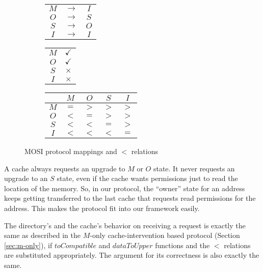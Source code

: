 \begin{figure}
\begin{subfigure}{.25\linewidth}
\centering
\begin{tabular}{|ccc|}
\hline
$M$ & $\rightarrow$ & $I$\\
$O$ & $\rightarrow$ & $S$\\
$S$ & $\rightarrow$ & $O$\\
$I$ & $\rightarrow$ & $I$\\
\hline
\end{tabular}
\end{subfigure}
\begin{subfigure}{.25\linewidth}
\centering
\begin{tabular}{|c|c|}
\hline
$M$ & $\checkmark$\\
$O$ & $\checkmark$\\
$S$ & $\times$\\
$I$ & $\times$\\
\hline
\end{tabular}
\end{subfigure}
\begin{subfigure}{.48\linewidth}
\centering
\begin{tabular}{|c|cccc|}
\hline
& $M$ & $O$ & $S$ & $I$\\
\hline
$M$ & $=$ & $>$ & $>$ & $>$\\
$O$ & $<$ & $=$ & $>$ & $>$\\
$S$ & $<$ & $<$ & $=$ & $>$\\
$I$ & $<$ & $<$ & $<$ & $=$\\
\hline
\end{tabular}
\end{subfigure}
\caption{MOSI protocol mappings and $<$ relations}
\label{fig:o-extend}
\end{figure}

A cache always requests an upgrade to $M$ or $O$ state. It never requests an
upgrade to an $S$ state, even if the cache wants permissions just to read the
location of the memory. So, in our protocol, the ``owner'' state for an address
keeps getting transferred to the last cache that requests read permissions for
the address. This makes the protocol fit into our framework easily.

The directory's and the cache's behavior on receiving a request is exactly the
same as described in the $M$-only cache-intervention based protocol (Section
\ref{sec:m-only}), if $toCompatible$ and $dataToUpper$ functions and the $<$
relations are substituted appropriately. The argument for its correctness is
also exactly the same.

